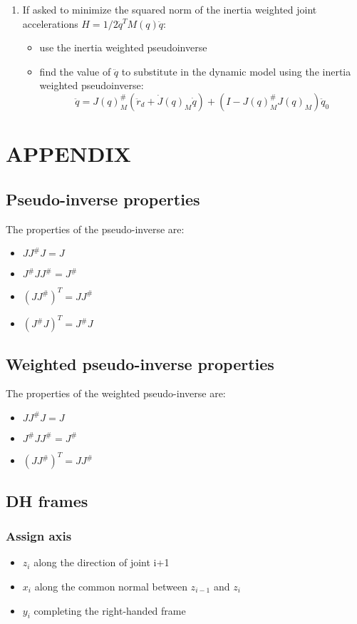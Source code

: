 \documentclass[a4paper,12pt]{article}
\begin{document}
\begin{enumerate}
\begin{itemize}
    \end{itemize}
    \item If asked to minimize the squared norm of 
    the inertia weighted 
    joint accelerations $H=1/2\ddot{q}^TM(q)\ddot{q}$:
    \begin{itemize}
        \item use the inertia weighted pseudoinverse
        \item find the value of $\ddot{q}$ to substitute 
        in the dynamic model using the inertia weighted pseudoinverse:
        \begin{equation}
            \ddot{q} = J(q)_M^{\#}(\ddot{r}_d + \dot{J}(q)_M\dot{q})+ (I-J(q)^{\#}_MJ(q)_M)\ddot{q}_0
            \end{equation}
    \end{itemize}
\end{enumerate}
\section{APPENDIX}
\subsection{Pseudo-inverse properties}\label{sec:Pseudo-inverse properties}
The properties of the pseudo-inverse are:
\begin{itemize}
    \item $J J^\# J = J$
    \item $J^\# J J^\# = J^\#$
    \item $(J J^\#)^T = J J^\#$
    \item $(J^\# J)^T = J^\# J$
\end{itemize}
\subsection{Weighted pseudo-inverse properties}
The properties of the weighted pseudo-inverse are:
\begin{itemize}
    \item $J J^\# J = J$
    \item $J^\# J J^\# = J^\#$
    \item $(J J^\#)^T = J J^\#$
\end{itemize}
\subsection{DH frames}
\subsubsection{Assign axis}
\begin{itemize}
    \item $z_i$ along the direction of joint i+1
    \item $x_i$ along the common normal between $z_{i-1}$ and $z_i$
    \item $y_i$ completing the right-handed frame
\end{itemize}
\end{document}
